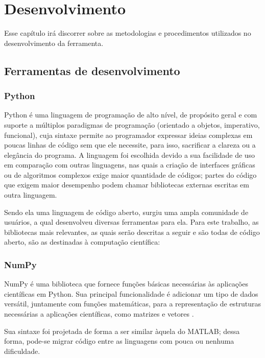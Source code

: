 \chapter{Desenvolvimento}

Esse capítulo irá discorrer sobre as metodologias e procedimentos utilizados no desenvolvimento da ferramenta.

\section{Ferramentas de desenvolvimento}

\subsection{Python}

Python \cite{pythondoc} é uma linguagem de programação de alto nível, de propósito geral e com suporte a múltiplos paradigmas de programação (orientado a objetos, imperativo, funcional), cuja sintaxe permite ao programador expressar ideias complexas em poucas linhas de código sem que ele necessite, para isso, sacrificar a clareza ou a elegância do programa. 
A linguagem foi escolhida devido a sua facilidade de uso em comparação com outras linguagens, nas quais a criação de interfaces gráficas ou de algoritmos complexos exige maior quantidade de códigos; partes do código que exigem maior desempenho podem chamar bibliotecas externas escritas em outra linguagem.

Sendo ela uma linguagem de código aberto, surgiu uma ampla comunidade de usuários, a qual desenvolveu diversas ferramentas para ela. Para este trabalho, as bibliotecas mais relevantes, as quais serão descritas a seguir e são todas de código aberto, são as destinadas à computação científica:

\subsection{NumPy}
NumPy é uma biblioteca que fornece funções básicas necessárias às aplicações científicas em Python. Sua principal funcionalidade é adicionar um tipo de dados versátil, juntamente com funções matemáticas, para a representação de estruturas necessárias a aplicações científicas, como matrizes e vetores \cite{numpydoc}. 

Sua sintaxe foi projetada de forma a ser similar àquela do MATLAB; dessa forma, pode-se migrar código entre as linguagens com pouca ou nenhuma dificuldade.

